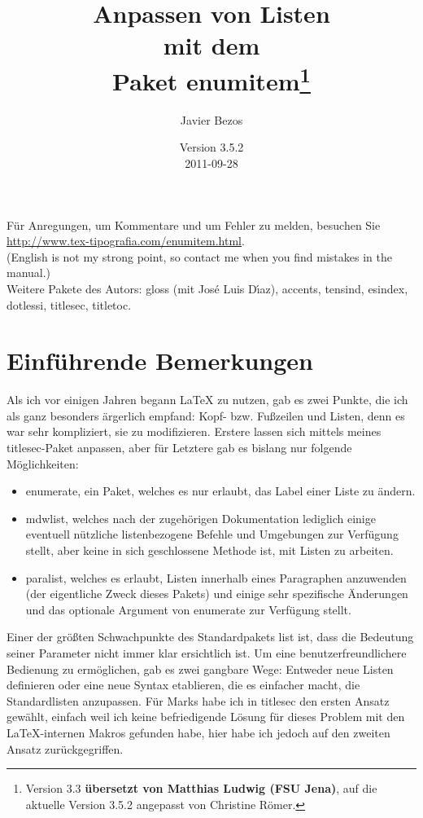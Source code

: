 \documentclass[a4paper,ngerman]{ltxguide}
\title{Anpassen von Listen\\ mit dem\\ Paket
\textsf{enumitem}\footnote{Version 3.3 \textbf{\"ubersetzt von Matthias Ludwig (FSU
Jena)}, auf die aktuelle Version 3.5.2 angepasst von Christine R\"omer.}}
\author{Javier Bezos}
\date{Version 3.5.2\\2011-09-28}
\newcommand\0{\unskip\enspace\fbox{\fontsize{4}{4}\selectfont NEU 3.0}}
\newcommand\3{\unskip\enspace\fbox{\fontsize{4}{4}\selectfont NEW 3.0}}
\begin{document}
\maketitle

F\"ur Anregungen, um Kommentare und um Fehler zu melden, besuchen Sie 
\url{http://www.tex-tipografia.com/enumitem.html}.\\
(English is not my strong point, so contact me when you
find mistakes in the manual.) \\
Weitere Pakete des Autors: \textsf{gloss} (mit Jos\'e Luis D\'{\i}az), \textsf{accents, tensind, 
esindex, dotlessi, titlesec, titletoc}.


	\section{Einf\"uhrende Bemerkungen}
	
Als ich vor einigen Jahren begann \LaTeX{} zu nutzen, gab es zwei Punkte, die ich als ganz 
besonders \"argerlich empfand: Kopf- bzw. Fu\ss zeilen und Listen, denn es
war sehr kompliziert, sie zu modifizieren. Erstere lassen sich mittels meines
\textsf{titlesec}-Paket anpassen, aber f\"ur 
Letztere gab es bislang nur folgende M\"oglichkeiten:
	
\begin{itemize}
\item{\textsf{enumerate}, ein Paket, welches es nur erlaubt, das Label einer
Liste zu \"andern.}
\item{\textsf{mdwlist}, welches nach der zugeh\"origen Dokumentation lediglich einige eventuell 
n\"utzliche listenbezogene Befehle und Umgebungen zur Verf\"ugung stellt, aber keine in sich geschlossene
Methode ist, mit Listen zu arbeiten.}
\item{\textsf{paralist}, welches es erlaubt, Listen innerhalb eines Paragraphen anzuwenden (der 
eigentliche Zweck dieses Pakets) und einige sehr spezifische \"Anderungen und das optionale Argument
von \textsf{enumerate} zur Verf\"ugung stellt.}
\end{itemize}

Einer der gr\"o\ss ten Schwachpunkte des Standardpakets \textsf{list} ist, dass die Bedeutung seiner Parameter 
nicht immer klar ersichtlich ist. Um eine benutzerfreundlichere Bedienung zu erm\"oglichen, gab es zwei gangbare Wege: 
Entweder neue Listen definieren oder eine neue Syntax etablieren, die es einfacher macht, die Standardlisten anzupassen. 
F\"ur Marks habe ich in \textsf{titlesec} den ersten Ansatz gew\"ahlt, einfach weil ich keine befriedigende L\"osung 
f\"ur dieses Problem mit den \LaTeX -internen Makros gefunden habe, hier habe ich jedoch auf den zweiten Ansatz 
zur\"uckgegriffen.
 
\end{document}

